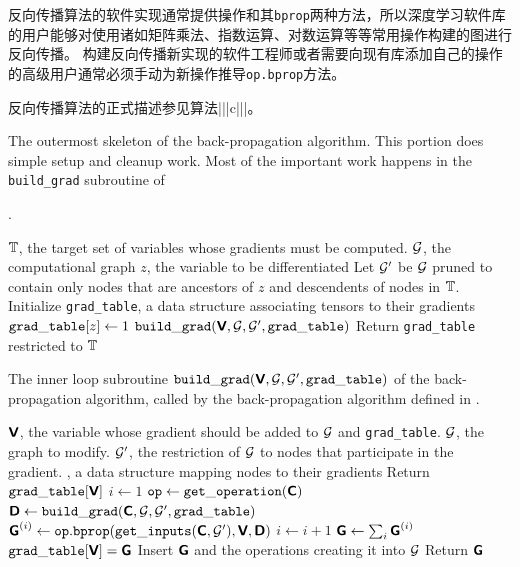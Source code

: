 反向传播算法的软件实现通常提供操作和其\verb|bprop|两种方法，所以深度学习软件库的用户能够对使用诸如矩阵乘法、指数运算、对数运算等等常用操作构建的图进行反向传播。
构建反向传播新实现的软件工程师或者需要向现有库添加自己的操作的高级用户通常必须手动为新操作推导\verb|op.bprop|方法。

反向传播算法的正式描述参见算法|||c|||。


\begin{algorithm}[ht]
\caption{The outermost skeleton of the back-propagation algorithm.
This portion does simple setup and cleanup work.
Most of the important work happens in the {\tt build\_grad} subroutine
of }. 
\label{alg:backprop}
\begin{algorithmic}
\REQUIRE $\mathbb{T}$, the target set of variables whose gradients must be computed.
\REQUIRE $\mathcal{G}$, the computational graph
\REQUIRE $z$, the variable to be differentiated
\STATE Let $\mathcal{G}'$ be $\mathcal{G}$ pruned to contain only nodes that are ancestors
of $z$ and descendents of nodes in $\mathbb{T}$.
\STATE Initialize {\tt grad\_table}, a data structure associating tensors
to their gradients
\STATE ${\tt grad\_table}[z] \leftarrow 1$
\STATE ${\tt build\_grad}(\textsf{\textbf{V}}, \mathcal{G}, \mathcal{G}', {\tt grad\_table})$
\ENDFOR
\STATE Return {\tt grad\_table} restricted to $\mathbb{T}$
\end{algorithmic}
\end{algorithm}

\begin{algorithm}[ht]
\caption{The inner loop subroutine
${\tt build\_grad}(\textsf{\textbf{V}}, \mathcal{G}, \mathcal{G}', {\tt grad\_table})$
of the back-propagation algorithm, called by
the back-propagation algorithm defined in .
}
\label{alg:build_grad}
\begin{algorithmic}
\REQUIRE $\textsf{\textbf{V}}$, the variable whose gradient should be added to $\mathcal{G}$
and {\tt grad\_table}.
\REQUIRE $\mathcal{G}$, the graph to modify.
\REQUIRE $\mathcal{G}'$, the restriction of $\mathcal{G}$ to nodes that participate
in the gradient.
, a data structure mapping nodes to their
gradients
 \STATE Return ${\tt grad\_table}[\textsf{\textbf{V}}]$
\ENDIF
\STATE $i \leftarrow 1$
\STATE ${\tt op} \leftarrow {\tt get\_operation}(\textsf{\textbf{C}})$
\STATE $\textsf{\textbf{D}} \leftarrow {\tt build\_grad}(\textsf{\textbf{C}}, \mathcal{G}, \mathcal{G}', {\tt grad\_table})$
\STATE $\textsf{\textbf{G}}^{(i)} \leftarrow {\tt op.bprop}({\tt get\_inputs}(\textsf{\textbf{C}}, \mathcal{G}'), \textsf{\textbf{V}}, \textsf{\textbf{D}})$ 
\STATE $i \leftarrow i + 1$
\ENDFOR
\STATE $\textsf{\textbf{G}} \leftarrow \sum_i \textsf{\textbf{G}}^{(i)}$
\STATE ${\tt grad\_table}[\textsf{\textbf{V}}] = \textsf{\textbf{G}}$
\STATE Insert $\textsf{\textbf{G}}$ and the operations creating it into $\mathcal{G}$
\STATE Return $\textsf{\textbf{G}}$
\end{algorithmic}
\end{algorithm}


